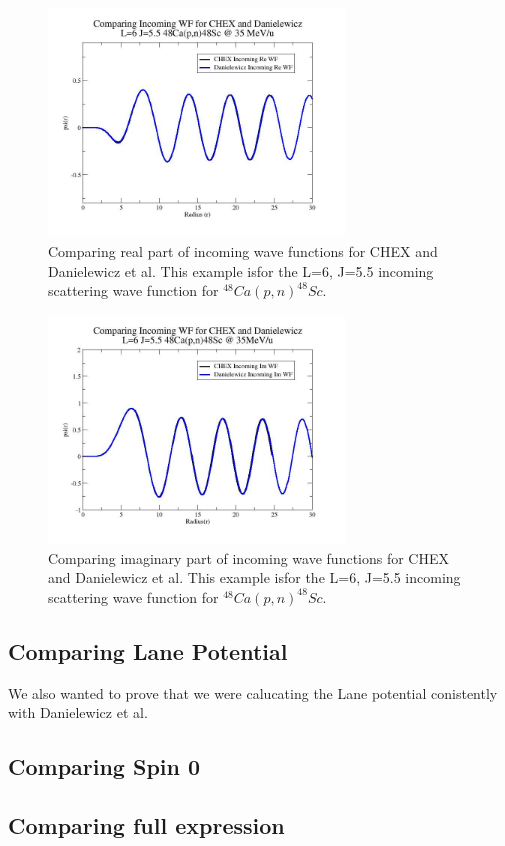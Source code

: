 \documentclass{article}
\begin{document}
\begin{figure}[H]
	\centering 
    \includegraphics[width=0.7\textwidth]{InWfComp.jpg}
    \caption{Comparing real part of incoming wave functions for CHEX and Danielewicz et al.  This example isfor the L=6, J=5.5 incoming scattering wave function for $^{48}Ca(p,n)^{48}Sc$.}
    \label{fig:inwfcompare}
\end{figure}

\begin{figure}[H]
	\centering 
    \includegraphics[width=0.7\textwidth]{ImWFComp.jpg}
    \caption{Comparing imaginary part of incoming wave functions for CHEX and Danielewicz et al.  This example isfor the L=6, J=5.5 incoming scattering wave function for $^{48}Ca(p,n)^{48}Sc$.}
    \label{fig:imwfcompare}
\end{figure}

\subsection{Comparing Lane Potential}

We also wanted to prove that we were calucating the Lane potential conistently with Danielewicz et al.


\subsection{Comparing Spin 0}

\subsection{Comparing full expression}





\end{document}

